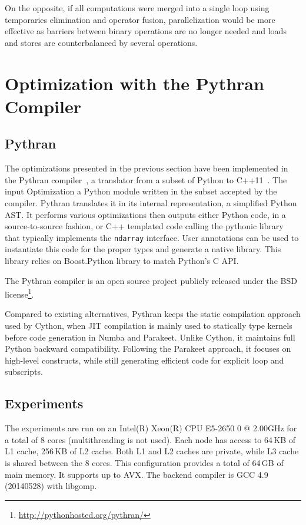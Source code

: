 \documentclass[10pt, preprint, nocopyrightspace]{sigplanconf}
\begin{document}
On the opposite, if all computations were merged into a single loop using
temporaries elimination and operator fusion, parallelization would be more
effective as barriers between binary operations are no longer needed and loads
and stores are counterbalanced by several operations.

\section{Optimization with the Pythran Compiler}

\subsection{Pythran}

The optimizations presented in the previous section have been implemented in the Pythran
compiler~\cite{pythran2013}, a translator from a subset of Python to
C++11~\cite{isocxx11}. The input Optimization a Python module written in
the subset accepted by the compiler. Pythran translates it in its internal representation, a
simplified Python AST. It performs various optimizations then outputs either
Python code, in a source-to-source fashion, or C++ templated code calling the pythonic library that typically implements the \texttt{ndarray}
interface. User annotations can be used to instantiate this code for the proper
types and generate a native library. This library relies on Boost.Python
library to match Python's C API.

The Pythran compiler is an open source project publicly released under the BSD
license\footnote{\url{http://pythonhosted.org/pythran/}}.

Compared to existing alternatives, Pythran keeps the static compilation
approach used by Cython, when JIT compilation is mainly used to statically type
kernels before code generation in Numba and Parakeet. Unlike Cython, it
maintains full Python backward compatibility.  Following the Parakeet approach,
it focuses on high-level constructs, while still generating efficient code for
explicit loop and subscripts.



\subsection{Experiments} \label{sec:xp}

The experiments are run on an Intel(R) Xeon(R) CPU E5-2650 0 @ 2.00GHz for a
total of 8 cores (multithreading is not used). Each node has access to 64\,KB
of L1 cache, 256\,KB of L2 cache. Both L1 and L2 caches are private, while L3
cache is shared between the 8 cores. This configuration provides a total of
64\,GB of main memory. It supports up to AVX. The backend compiler is GCC 4.9
(20140528) with libgomp.
\end{document}
